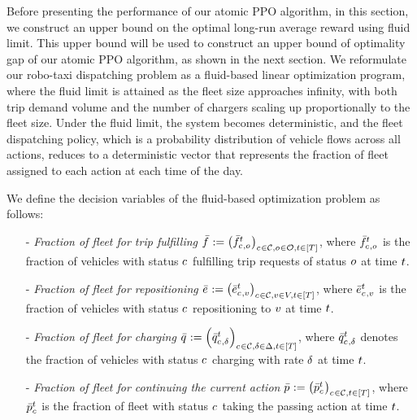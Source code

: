 Before presenting the performance of our atomic PPO algorithm, in this section, we construct an upper bound on the optimal long-run average reward using fluid limit. This upper bound will be used to construct an upper bound of optimality gap of our atomic PPO algorithm, as shown in the next section. We reformulate our robo-taxi dispatching problem as a fluid-based linear optimization program, where the fluid limit is attained as the fleet size approaches infinity, with both trip demand volume and the number of chargers scaling up proportionally to the fleet size. Under the fluid limit, the system becomes deterministic, and the fleet dispatching policy, which is a probability distribution of vehicle flows across all actions, reduces to a deterministic vector that represents the fraction of fleet assigned to each action at each time of the day.


We define the decision variables of the fluid-based optimization problem as follows:
\begin{enumerate}
    \item[-] \emph{Fraction of fleet for trip fulfilling $\bar{f}^{}_{} := \left(\bar{f}^{t}_{c_{}, o_{}}\right)_{c_{} \in \mathcal{C}, o_{} \in \mathcal{O}, t \in [T]}$}, where $\bar{f}^{t}_{c_{}, o_{}}$ is the fraction of vehicles with status $c_{}$ fulfilling trip requests of status $o_{}$ at time $t$.
    \item[-] \emph{Fraction of fleet for repositioning $\bar{e}^{}_{} := \left(\bar{e}^{t}_{c_{}, v}\right)_{c_{} \in \mathcal{C}, v \in V, t \in [T]}$}, where $\bar{e}^{t}_{c_{}, v}$ is the fraction of vehicles with status $c_{}$ repositioning to $v$ at time $t$. 
    \item[-] \emph{Fraction of fleet for charging $\bar{q}^{}_{} := \left(\bar{q}^{t}_{c_{}, \delta}\right)_{c_{} \in \mathcal{C}, \delta \in \Delta, t \in [T]}$}, where $\bar{q}^{t}_{c_{}, \delta}$ denotes the fraction of vehicles with status $c_{}$ charging with rate $\delta$ at time $t$.
    \item[-] \emph{Fraction of fleet for continuing the current action $\bar{p}^{}_{} := \left(\bar{p}^{t}_{c_{}}\right)_{c_{} \in \mathcal{C}, t \in [T]}$}, where $\bar{p}^{t}_{c_{}}$ is the fraction of fleet with status $c_{}$ taking the passing action at time $t$.
\end{enumerate}

